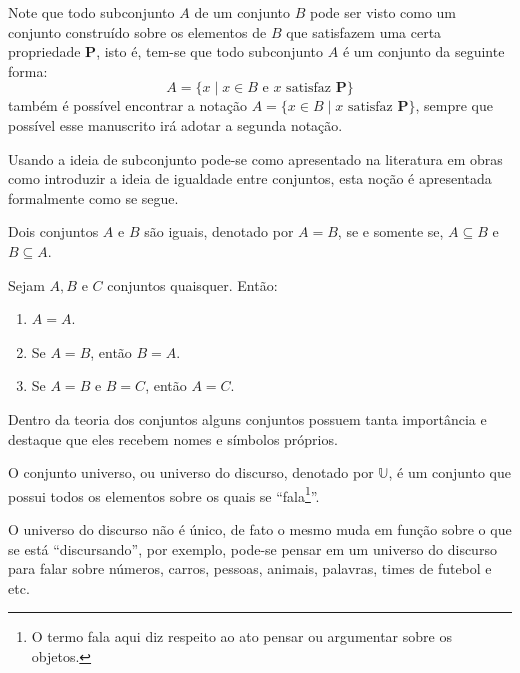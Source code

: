 \begin{remark}
	Note que todo subconjunto $A$ de um conjunto $B$ pode ser visto como um conjunto construído sobre os elementos de $B$ que satisfazem uma certa propriedade $\textbf{P}$, isto é, tem-se que todo subconjunto $A$ é um conjunto da seguinte forma:
	$$A = \{x \mid x \in B \mbox{ e } x \mbox{ satisfaz } \textbf{P}\}$$
	também é possível encontrar a notação $A = \{x \in B  \mid x \mbox{ satisfaz } \textbf{P}\}$, sempre que possível esse manuscrito irá adotar a segunda notação.
\end{remark}

Usando a ideia de subconjunto pode-se como apresentado na literatura em obras como \cite{abe1991-TC, halmos2001, lipschutz1978-TC} introduzir a ideia de igualdade entre conjuntos, esta noção é apresentada formalmente como se segue.

\begin{definition}\label{def:IgualdadeConjuntos}
	\cite{abe1991-TC} Dois conjuntos $A$ e $B$ são iguais, denotado por $A = B$, se e somente se, $A \subseteq B$ e $B \subseteq A$.
\end{definition}

\begin{theorem}
	Sejam $A, B$ e $C$ conjuntos quaisquer. Então:
	\begin{enumerate}
		\item $A = A$.
		\item Se $A = B$, então $B = A$.
		\item Se $A = B$ e $B = C$, então $A = C$.
	\end{enumerate}
\end{theorem}

Dentro da teoria dos conjuntos alguns conjuntos possuem tanta importância e destaque que eles recebem nomes e símbolos próprios. 

\begin{definition}\label{def:ConjuntoUniverso}
	O conjunto universo, ou universo do discurso, denotado por $\mathbb{U}$, é um conjunto que possui todos os elementos sobre os quais se ``fala\footnote{O termo fala aqui diz respeito ao ato pensar ou argumentar sobre os objetos.}''.
\end{definition}

O universo do discurso não é único, de fato o mesmo muda em função sobre o que se está ``discursando'', por exemplo, pode-se pensar em um universo do discurso para falar sobre números, carros, pessoas, animais, palavras, times de futebol e etc.


